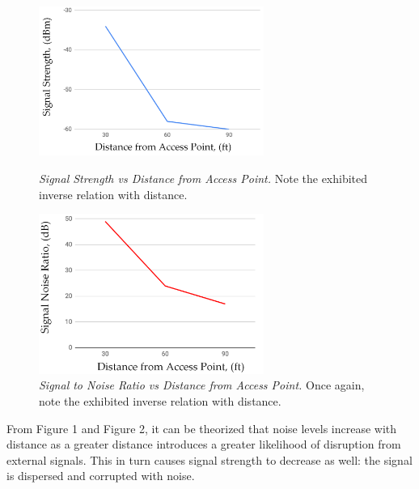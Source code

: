 \documentclass[twoside,twocolumn]{article}
\begin{document}
\begin{figure}[htbp]
    \centering
    \includegraphics[width=2.9in]{StrDst.png}
    \caption{\textit{Signal Strength vs Distance from Access Point.} Note the exhibited inverse relation with distance.}
    \centering
    \includegraphics[width=2.9in]{SNR.png}
    \caption{\textit{Signal to Noise Ratio vs Distance from Access Point.} Once again, note the exhibited inverse relation with distance.}
\end{figure}

\noindent From Figure 1 and Figure 2, it can be theorized that noise levels increase with distance as a greater distance introduces a greater likelihood of disruption from external signals. This in turn causes signal strength to decrease as well: the signal is dispersed and corrupted with noise.

\newpage
\end{document}
